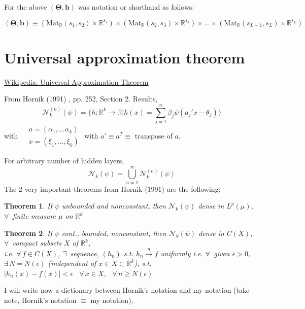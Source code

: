 \documentclass[10pt]{amsart}
\newtheorem{theorem}{Theorem}
\begin{document}
\begin{multicols*}{2}
For the above $\mathbf{ (\Theta,b)}$ was notation or shorthand as follows:

\[
\mathbf{ (\Theta,b ) } \equiv (\text{Mat}_{\mathbb{R}}(s_1,s_2) \times \mathbb{R}^{s_2}) \times (\text{Mat}_{\mathbb{R}}(s_2,s_3) \times \mathbb{R}^{s_3} ) \times \dots \times (\text{Mat}_{\mathbb{R}}(s_{L-1},s_L) \times \mathbb{R}^{s_L} )
\]


\section{Universal approximation theorem}

\href{https://en.wikipedia.org/wiki/Universal_approximation_theorem}{Wikipedia: Universal Approximation Theorem}

From Hornik (1991) \cite{Horn1991}, pp. 252, Section 2. Results,
\begin{equation}
  \mathcal{N}_k^{(n)}(\psi)  = \lbrace h :\mathbb{R}^k \to \mathbb{R} | h(x) =\sum_{j=1}^n \beta_j \psi(a_j'x- \theta_j) \rbrace
\end{equation}
with
$\begin{aligned}
  & a = (\alpha_1 , \dots \alpha_k) \\ 
 & x = ( \xi_1, \dots, \xi_k) 
  \end{aligned}
$ with $a' \equiv a^T \equiv $ transpose of $a$.  

For arbitrary number of hidden layers,
\[
\mathcal{N}_k(\psi) = \bigcup_{n=1}^{\infty}\mathcal{N}_k^{(n)}(\psi)
\]
The 2 very important theorems from Hornik (1991) are the following:
\begin{theorem}
If $\psi$ unbounded and nonconstant, then $\mathcal{N}_k(\psi)$ dense in $L^p(\mu)$, $\forall \, $ finite measure $\mu$ on $\mathbb{R}^k$
\end{theorem}
\begin{theorem}
  If $\psi$ cont., bounded, nonconstant, then $\mathcal{N}_k(\psi)$ dense in $C(X)$, \, $\forall \,$ compact subsets $X$ of $\mathbb{R}^k$, \\
  i.e. $\forall \, f\in C(X)$, $\exists \, $ sequence, $(h_n)$ s.t. $h_n \xrightarrow{n} f$ uniformly i.e. $\forall \, $ given $\epsilon >0$, $\exists \, N=N(\epsilon)$ (independent of $x\in X\subset \mathbb{R}^k$), s.t. \\
  $|h_n(x)-f(x)| < \epsilon$ \, $\forall \, x \in X$, \, $\forall \, n \geq N(\epsilon)$
  \end{theorem}
I will write now a dictionary between Hornik's notation and my notation (take note, Hornik's notation $\equiv$ my notation).  


\end{multicols*}
\end{document}
